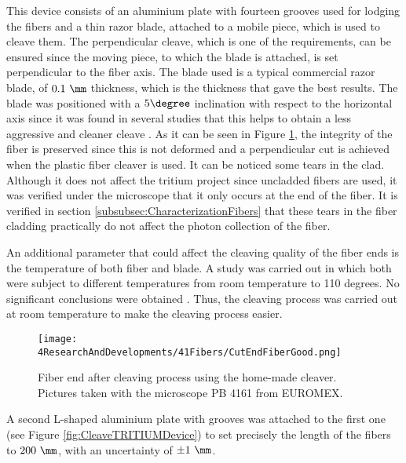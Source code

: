 This device consists of an aluminium plate with fourteen grooves used for lodging the fibers and a thin razor blade, attached to a mobile piece, which is used to cleave them. The perpendicular cleave, which is one of the requirements, can be ensured since the moving piece, to which the blade is attached, is set perpendicular to the fiber axis. The blade used is a typical commercial razor blade, of $0.1~\mm$ thickness, which is the thickness that gave the best results. The blade was positioned with a $5\degree$ inclination with respect to the horizontal axis since it was found in several studies that this helps to obtain a less aggressive and cleaner cleave \cite{AngleBlade, TemperatureBlade}. As it can be seen in Figure \ref{fig:CleavingFiberEnd}, the integrity of the fiber is preserved since this is not deformed and a perpendicular cut is achieved when the plastic fiber cleaver is used. It can be noticed some tears in the clad. Although it does not affect the tritium project since uncladded fibers are used, it was verified under the microscope that it only occurs at the end of the fiber. It is verified in section \ref{subsubsec:CharacterizationFibers} that these tears in the fiber cladding practically do not affect the photon collection of the fiber.

An additional parameter that could affect the cleaving quality of the fiber ends is the temperature of both fiber and blade. A study was carried out in which both were subject to different temperatures from room temperature to 110 degrees. No significant conclusions were obtained \cite{TFGAlberto}. Thus, the cleaving process was carried out at room temperature to make the cleaving process easier.

\begin{figure}[h]
\centering
\texttt{[image: 4ResearchAndDevelopments/41Fibers/CutEndFiberGood.png]}
\caption{Fiber end after cleaving process using the home-made cleaver. Pictures taken with the microscope PB 4161 from EUROMEX.\label{fig:CleavingFiberEnd}}
\end{figure}

A second L-shaped aluminium plate with grooves was attached to the first one (see Figure \ref{fig:CleaveTRITIUMDevice}) to set precisely the length of the fibers to $200~\mm$, with an uncertainty of $\pm 1~\mm$.